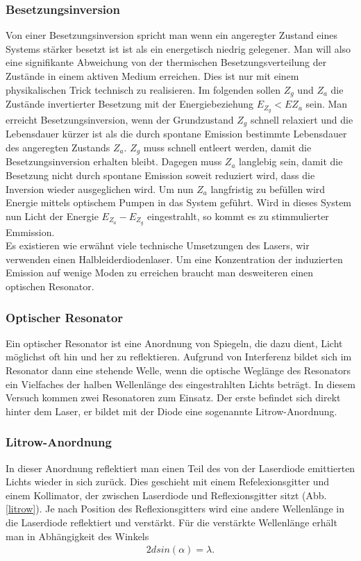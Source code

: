 \documentclass[12pt]{article}
\begin{document}
\subsubsection{Besetzungsinversion}
Von einer Besetzungsinversion spricht man wenn ein angeregter Zustand eines Systems stärker besetzt ist ist als ein energetisch niedrig gelegener. Man will also eine signifikante Abweichung von der thermischen Besetzungsverteilung der Zustände in einem aktiven Medium erreichen. Dies ist nur mit einem physikalischen Trick technisch zu realisieren.
Im folgenden sollen $Z_g$ und $Z_a$ die Zustände invertierter Besetzung mit der Energiebeziehung $E_{Z_g}<E{Z_a}$ sein.
Man erreicht Besetzungsinversion, wenn der Grundzustand $Z_g$ schnell relaxiert und die Lebensdauer kürzer ist als die durch spontane Emission bestimmte Lebensdauer des angeregten  Zustands $Z_a$. $Z_g$ muss schnell entleert werden, damit die Besetzungsinversion erhalten bleibt. Dagegen muss $Z_a$ langlebig sein, damit die Besetzung nicht durch spontane Emission soweit reduziert wird, dass die Inversion wieder ausgeglichen wird. Um nun $Z_a$ langfristig zu befüllen wird Energie mittels optischem Pumpen in das System geführt. Wird in dieses System nun Licht der Energie $E_{Z_a}-E_{Z_g}$ eingestrahlt, so kommt es zu stimmulierter Emmission.\\
Es existieren wie erwähnt viele technische Umsetzungen des Lasers, wir verwenden einen Halbleiderdiodenlaser.
Um eine Konzentration der induzierten Emission auf wenige Moden zu erreichen braucht man desweiteren einen optischen Resonator.

\subsubsection{Optischer Resonator}
Ein optischer Resonator ist eine Anordnung von Spiegeln, die dazu dient, Licht möglichst oft hin und her zu reflektieren. Aufgrund von Interferenz bildet sich im Resonator dann eine stehende Welle, wenn die optische Weglänge des Resonators ein Vielfaches der halben Wellenlänge des eingestrahlten Lichts beträgt. In diesem Versuch kommen zwei Resonatoren zum Einsatz. Der erste befindet sich direkt hinter dem Laser, er bildet mit der Diode eine sogenannte Litrow-Anordnung.
\subsubsection{Litrow-Anordnung}
In dieser Anordnung reflektiert man einen Teil des von der Laserdiode emittierten Lichts wieder in sich zurück. Dies geschieht mit einem Refelexionsgitter und einem Kollimator, der zwischen Laserdiode und Reflexionsgitter sitzt (Abb. \ref{litrow}). Je nach Position des Reflexionsgitters wird eine andere Wellenlänge in die Laserdiode reflektiert und verstärkt. Für die verstärkte Wellenlänge erhält man in Abhängigkeit des Winkels
\begin{align}
\label{litrowpeak}
 2d sin(\alpha) = \lambda.
\end{align}
\end{document}
